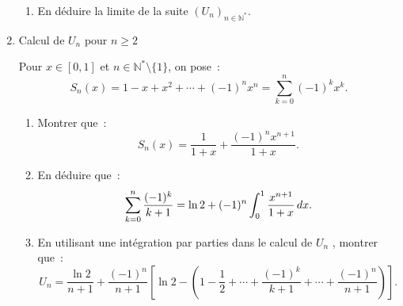 \begin{exercice}
\begin{enumerate}
\begin{enumerate}
\item En d\'{e}duire la limite de la suite $\left( U_{n}\right) _{n\in 
\mathbb{N}^{*}}$.
\end{enumerate}


\item Calcul de $U_n$ pour $n\geqslant 2$


Pour $x\in [0,1]$ et $n\in \mathbb{N}^*\setminus \{1\}$, on pose~: 
\begin{equation*}
S_n(x)=1-x+x^2+\cdots+(-1)^nx^n=\sum_{k=0}^n(-1)^kx^k.
\end{equation*}

\begin{enumerate}
\item Montrer que~: 
\begin{equation*}
S_{n}(x)=\frac{1}{1+x}+\frac{(-1)^{n}x^{n+1}}{1+x}.
\end{equation*}

\item En d\'{e}duire que~: 
\begin{equation*}
\sum_{k=0}^{n}\frac{(-1)^{k}}{k+1}=\ln 2+(-1)^{n}\int_{0}^{1}\frac{x^{n+1}}{%
1+x}\,dx.
\end{equation*}

\item En utilisant une int\'{e}gration par parties dans le calcul de $U_{n}$%
, montrer que~: 
\begin{equation*}
U_{n}=\frac{\ln 2}{n+1}+\frac{(-1)^{n}}{n+1}\left[ \ln 2-\left( 1-\frac{1}{2}%
+\cdots +\frac{(-1)^{k}}{k+1}+\cdots +\frac{(-1)^{n}}{n+1}\right) \right] .
\end{equation*}
\end{enumerate}

\end{enumerate}

\end{exercice}





